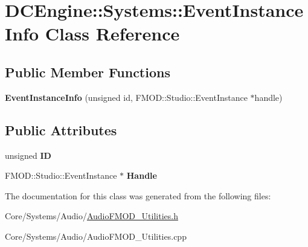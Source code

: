 \hypertarget{classDCEngine_1_1Systems_1_1EventInstanceInfo}{\section{D\-C\-Engine\-:\-:Systems\-:\-:Event\-Instance\-Info Class Reference}
\label{classDCEngine_1_1Systems_1_1EventInstanceInfo}
}
\subsection*{Public Member Functions}
\begin{DoxyCompactItemize}
\item 
\hypertarget{classDCEngine_1_1Systems_1_1EventInstanceInfo_a5b2705fd3f70de3689399746b696e5c4}{{\bfseries Event\-Instance\-Info} (unsigned id, F\-M\-O\-D\-::\-Studio\-::\-Event\-Instance $\ast$handle)}\label{classDCEngine_1_1Systems_1_1EventInstanceInfo_a5b2705fd3f70de3689399746b696e5c4}

\end{DoxyCompactItemize}
\subsection*{Public Attributes}
\begin{DoxyCompactItemize}
\item 
\hypertarget{classDCEngine_1_1Systems_1_1EventInstanceInfo_a5a98f4545e7d03b0366e6db410c31cc3}{unsigned {\bfseries I\-D}}\label{classDCEngine_1_1Systems_1_1EventInstanceInfo_a5a98f4545e7d03b0366e6db410c31cc3}

\item 
\hypertarget{classDCEngine_1_1Systems_1_1EventInstanceInfo_a0b87b31b2ed78f1eacb03761b31e7d2c}{F\-M\-O\-D\-::\-Studio\-::\-Event\-Instance $\ast$ {\bfseries Handle}}\label{classDCEngine_1_1Systems_1_1EventInstanceInfo_a0b87b31b2ed78f1eacb03761b31e7d2c}

\end{DoxyCompactItemize}


The documentation for this class was generated from the following files\-:\begin{DoxyCompactItemize}
\item 
Core/\-Systems/\-Audio/\hyperlink{AudioFMOD__Utilities_8h}{Audio\-F\-M\-O\-D\-\_\-\-Utilities.\-h}\item 
Core/\-Systems/\-Audio/Audio\-F\-M\-O\-D\-\_\-\-Utilities.\-cpp\end{DoxyCompactItemize}
